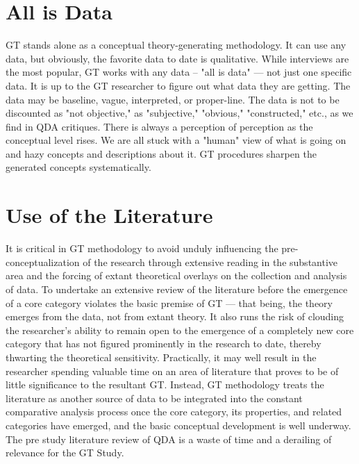 \section*{All is Data}

GT stands alone as a conceptual theory-generating methodology. 
It can use any data, but obviously, the favorite data to date is qualitative. 
While interviews are the most popular, 
GT works with any data -- "all is data" --- not just one specific data. 
It is up to the GT researcher to figure out what data they are getting. 
The data may be baseline, vague, interpreted, or proper-line. 
The data is not to be discounted as "not objective," 
as "subjective," "obvious," "constructed," etc., as we find in QDA critiques. 
There is always a perception of perception as the conceptual level rises.
We are all stuck with a "human" view of what is going on
and hazy concepts and descriptions about it. 
GT procedures sharpen the generated concepts systematically.

\section*{Use of the Literature}

It is critical in GT methodology to avoid unduly influencing the pre-conceptualization of the research through extensive reading in the substantive area and the forcing of extant theoretical overlays on the collection and analysis of data. 
To undertake an extensive review of the literature before the emergence of a core category violates the basic premise of GT --- that being, the theory emerges from the data, not from extant theory. 
It also runs the risk of clouding the researcher’s ability to remain open to the emergence of a completely new core category that has not figured prominently in the research to date, thereby thwarting the theoretical sensitivity. 
Practically, it may well result in the researcher spending valuable time on an area of literature that proves to be of
little significance to the resultant GT. 
Instead, GT methodology treats the literature as another source of data to be integrated into the constant comparative analysis process once the core category, its properties, and related categories have emerged, and the basic conceptual development is well underway. 
The pre study literature review of QDA is a waste of time and a
derailing of relevance for the GT Study.

